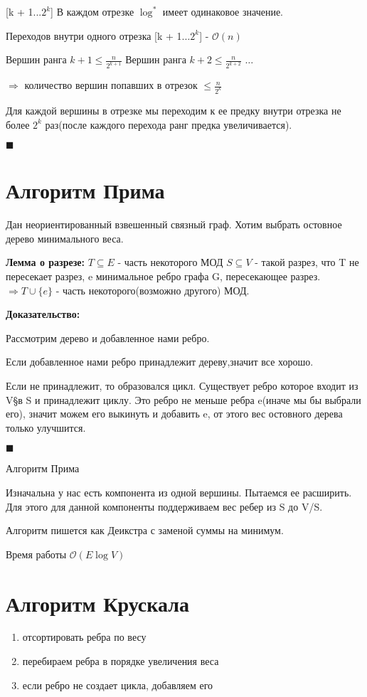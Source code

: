 \documentclass[12pt]{article}
\def\O{\mathcal{O}}
\begin{document}
[k + 1...$2^k$] В каждом отрезке $\log^*$ имеет одинаковое значение.

Переходов внутри одного отрезка [k + 1...$2^k$] - $\O(n)$

Вершин ранга $k + 1 \le \frac{n}{2^{k + 1}}$
Вершин ранга $k + 2 \le \frac{n}{2^{k + 2}}$
 $\ldots$

 $\Rightarrow$ количество вершин попавших в отрезок $\le \frac{n}{2^k}$

Для каждой вершины в отрезке мы переходим к ее предку внутри отрезка не более $2^k$ раз(после каждого перехода ранг предка увеличивается).

$\blacksquare$

\section{Алгоритм Прима}
Дан неориентированный взвешенный связный граф. Хотим выбрать остовное дерево минимального веса.

{\bf Лемма о разрезе:} $T \subseteq E$ - часть некоторого МОД $S \subseteq V$ - такой разрез, что T не пересекает разрез, e минимальное ребро графа G, пересекающее разрез.
$\Rightarrow T \cup \{e\}$ - часть некоторого(возможно другого) МОД.
  
{\bf  Доказательство:} 

Рассмотрим дерево и добавленное нами ребро. 

Если добавленное нами ребро принадлежит дереву,значит все хорошо.

Если не принадлежит, то образовался цикл. Существует ребро которое входит из V\S в S и принадлежит циклу. Это ребро не меньше ребра e(иначе мы бы выбрали его),  значит можем его выкинуть и добавить e, от этого вес остовного дерева только улучшится. 

$\blacksquare$

{Алгоритм Прима}

Изначальна у нас есть компонента из одной вершины. Пытаемся ее расширить. Для этого для данной компоненты поддерживаем вес ребер из S до V/S.

Алгоритм пишется как Деикстра с заменой суммы на минимум.

Время работы $\O(E\log V)$

\section{Алгоритм Крускала}
\begin{enumerate}
\item отсортировать ребра по весу
\item перебираем ребра в порядке увеличения веса
\item если ребро не создает цикла, добавляем его
\end{enumerate}
\end{document}
